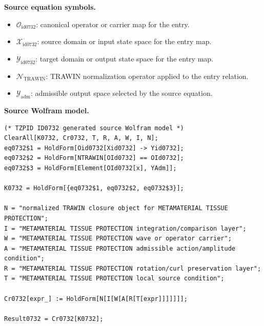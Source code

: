 \begin{minipage}[t]{0.49\linewidth}
\begingroup
\small
\raggedright
\textbf{Source equation symbols.}\par
\begin{itemize}[leftmargin=1.35em,itemsep=1pt,topsep=1pt,parsep=0pt]
    \item $\mathcal{O}_{\mathrm{id0732}}$: canonical operator or carrier map for the entry.
    \item $\mathcal{X}_{\mathrm{id0732}}$: source domain or input state space for the entry map.
    \item $\mathcal{Y}_{\mathrm{id0732}}$: target domain or output state space for the entry map.
    \item $\mathcal{N}_{\mathrm{TRAWIN}}$: TRAWIN normalization operator applied to the entry relation.
    \item $\mathcal{Y}_{\mathrm{adm}}$: admissible output space selected by the source equation.
\end{itemize}
\endgroup
\end{minipage}\hfill
\begin{minipage}[t]{0.47\linewidth}
\begingroup
\scriptsize
\raggedright
\textbf{Source Wolfram model.}\par
\begin{Verbatim}[fontsize=\tiny,breaklines=true,breakanywhere=true]
(* TZPID ID0732 generated source Wolfram model *)
ClearAll[K0732, Cr0732, T, R, A, W, I, N];
eq0732$1 = HoldForm[Oid0732[Xid0732] -> Yid0732];
eq0732$2 = HoldForm[NTRAWIN[OId0732] == OId0732];
eq0732$3 = HoldForm[Element[OId0732[x], YAdm]];

K0732 = HoldForm[{eq0732$1, eq0732$2, eq0732$3}];

N = "normalized TRAWIN closure object for METAMATERIAL TISSUE PROTECTION";
I = "METAMATERIAL TISSUE PROTECTION integration/comparison layer";
W = "METAMATERIAL TISSUE PROTECTION wave or operator carrier";
A = "METAMATERIAL TISSUE PROTECTION admissible action/amplitude condition";
R = "METAMATERIAL TISSUE PROTECTION rotation/curl preservation layer";
T = "METAMATERIAL TISSUE PROTECTION local source condition";

Cr0732[expr_] := HoldForm[N[I[W[A[R[T[expr]]]]]]];

Result0732 = Cr0732[K0732];
\end{Verbatim}
\endgroup
\end{minipage}


